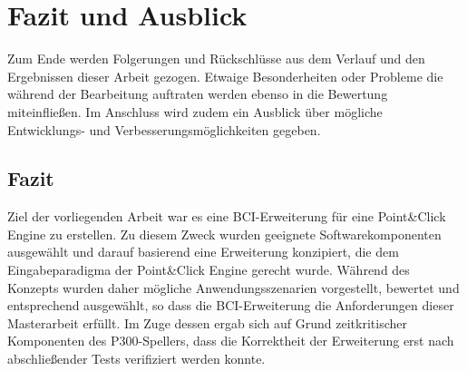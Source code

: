 \chapter{Fazit und Ausblick}
Zum Ende werden Folgerungen und Rückschlüsse aus dem Verlauf und den Ergebnissen dieser Arbeit gezogen.
Etwaige Besonderheiten oder Probleme die während der Bearbeitung auftraten werden ebenso in die Bewertung miteinfließen.
Im Anschluss wird zudem ein Ausblick über mögliche Entwicklungs- und Verbesserungsmöglichkeiten gegeben.\\


\section{Fazit}

Ziel der vorliegenden Arbeit war es eine \acs{BCI}-Erweiterung für eine Point\&Click \mbox{Engine} zu erstellen.
Zu diesem Zweck wurden geeignete Softwarekomponenten ausgewählt und darauf basierend eine Erweiterung konzipiert,
die dem Eingabeparadigma der Point\&Click Engine gerecht wurde.
Während des Konzepts wurden daher mögliche Anwendungsszenarien vorgestellt, bewertet und entsprechend ausgewählt,
so dass die \acs{BCI}-Erweiterung die Anforderungen dieser Masterarbeit erfüllt.
Im Zuge dessen ergab sich auf Grund zeitkritischer Komponenten des P300-Spellers, dass die Korrektheit der Erweiterung erst nach abschließender Tests verifiziert werden konnte.\\

